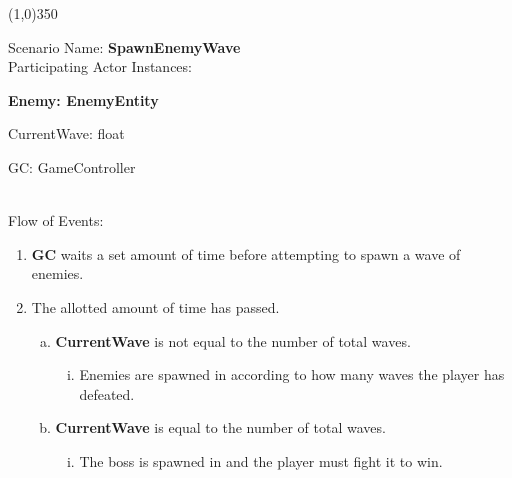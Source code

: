 \documentclass[12pt]{article}       %
\begin{document}
\begin{center} \line(1,0){350} \end{center}
Scenario Name: {\bf SpawnEnemyWave} \\
Participating Actor Instances:        \hspace{46pt} {\bf Enemy: EnemyEntity

						\hspace{2.6 in} CurrentWave: float

					          \hspace{2.6 in}   GC: GameController}  \vspace{10pt}  \\ 
Flow of Events: 
\begin{enumerate} 
\item {\bf GC} waits a set amount of time before attempting to spawn a wave of enemies.
\item The allotted amount of time has passed.
	\begin{enumerate} [a.]
	\item {\bf CurrentWave} is not equal to the number of total waves.
		\begin{enumerate} [i.]
		\item Enemies are spawned in according to how many waves the player has defeated.
		\end{enumerate}
	\item {\bf CurrentWave} is equal to the number of total waves.
		\begin{enumerate} [i.]
		\item The boss is spawned in and the player must fight it to win.
		\end{enumerate}
	\end{enumerate}
\end{enumerate}
\end{document}

